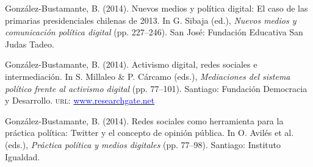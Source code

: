 \begin{publications}
\begin{benumerate}{12}
\item{\small González-Bustamante, B. (2014). Nuevos medios y política digital: El caso de las primarias presidenciales chilenas de 2013. In G. Sibaja (ed.), {\itshape Nuevos  medios y comunicación política digital} (pp. 227--246). San José: Fundación Educativa San Judas Tadeo.}\vspace{1mm}


\item{\small González-Bustamante, B. (2014). Activismo digital, redes sociales e intermediación. In S. Millaleo \& P. C\'arcamo (eds.), {\itshape Mediaciones del  sistema político frente al activismo digital} (pp. 77--101). Santiago: Fundación Democracia y Desarrollo. {\scshape url:} \href{https://www.researchgate.net/publication/321992867_Activismo_digital_redes_sociales_e_intermediacion}{\textcolor{blue}{www.researchgate.net}}}\vspace{1mm}


\item{\small González-Bustamante, B. (2014). Redes sociales como herramienta para la práctica política: Twitter y el concepto de opinión pública. In O. Avilés et al. (eds.), {\itshape Práctica política y medios digitales} (pp. 77--98). Santiago: Instituto Igualdad.}\vspace{1mm}



\end{benumerate}
\end{publications}

